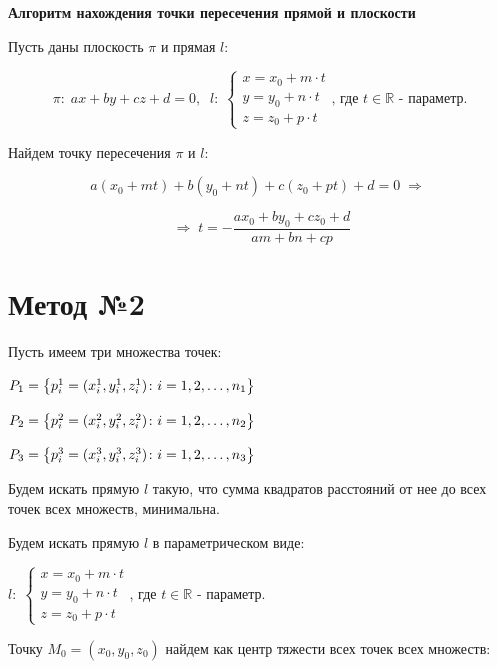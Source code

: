 \documentclass[article,final,14pt]{scrreprt}
\begin{document}
\vspace{0.5cm}
\textbf{Алгоритм нахождения точки пересечения прямой и плоскости}

Пусть даны плоскость $\pi$ и прямая $\mathit{l}$:

$$\pi: \; ax+by+cz+d=0, \;\; \mathit{l}: \; 
\begin{cases}
	x = x_0 + m \cdot t \\
	y = y_0 + n \cdot t \\
	z = z_0 + p \cdot t
\end{cases}\text{, где }t \in \mathbb{R}\text{ - параметр.} $$

Найдем точку пересечения $\pi$ и $\mathit{l}$:

$$a (x_0 + m t) + b (y_0 + n t) + c (z_0 + p t) + d = 0 \; \Rightarrow \; $$

$$\; \Rightarrow \; t = - \frac{a x_0 + b y_0 + c z_0 + d}{a m + b n + c p}$$

\newpage
\section{Метод №2}\label{meth2}

Пусть имеем три множества точек: 

\begin{center}
	$P_1 = \left\{p_i^1 = (x_i^1, y_i^1, z_i^1)\colon i=1,2,\dots,n_1\right\}$

	\vspace{0.3cm}
	$P_2 = \left\{p_i^2 = (x_i^2, y_i^2, z_i^2)\colon i=1,2,\dots,n_2\right\}$

	\vspace{0.3cm}
	$P_3 = \left\{p_i^3 = (x_i^3, y_i^3, z_i^3)\colon i=1,2,\dots,n_3\right\}$
\end{center}

Будем искать прямую $\mathit{l}$ такую, что сумма квадратов расстояний от нее до всех точек всех множеств, минимальна.

Будем искать прямую $\mathit{l}$ в параметрическом виде:

\begin{center}
	$\mathit{l}: \; \begin{cases}
		x = x_0 + m \cdot t \\
		y = y_0 + n \cdot t \\
		z = z_0 + p \cdot t
	\end{cases}$, где $t \in \mathbb{R}$ - параметр. 
\end{center}

Точку $M_0 = (x_0, y_0, z_0)$ найдем как центр тяжести всех точек всех множеств:
\end{document}
